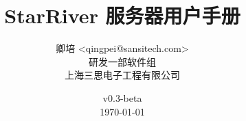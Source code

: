 \title{\textbf{StarRiver 服务器用户手册}}

\author{卿培 <qingpei@sansitech.com> \\
        研发一部软件组\\
        上海三思电子工程有限公司
}

\date{\vspace{3em} v0.3-beta \\\vspace{3em} \today}
